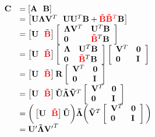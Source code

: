 \begin{equation}
\begin{array}{llll}
\mathbf{C} &= \left[{\mathbf{A}} \ \ \mathbf{B}\right]\\
&= \left[\mathbf{U}\mathbf{\Lambda}\mathbf{V}^T \ \ \mathbf{U}\mathbf{U}^T\mathbf{B} + {\color{red}\mathbf{\tilde{B}}} {\color{red}\mathbf{\tilde{B}}^T}{\mathbf{B}}\right]\\
&= \left[\mathbf{U} \ \ {\color{red}\mathbf{\tilde{B}}}\right]\left[\begin{array}{llll}\mathbf{\Lambda}\mathbf{V}^T &\mathbf{U}^T\mathbf{B}\\ \mathbf{0} & {\color{red}\mathbf{\tilde{B}}}^T\mathbf{B}\end{array}\right]\\
&= \left[\mathbf{U} \ \ {\color{red}\mathbf{\tilde{B}}}\right]\left[\begin{array}{llll}\mathbf{\Lambda} & \mathbf{U}^T\mathbf{B}\\ \mathbf{0} & {\color{red}\mathbf{\tilde{B}}}^T\mathbf{B}\end{array}\right] \left[\begin{array}{llll}\mathbf{V}^T & \mathbf{0}\\ \mathbf{0} & \mathbf{I}\end{array}\right]\\
&= \left[\mathbf{U} \ \ {\color{red}\mathbf{\tilde{B}}}\right]\mathbf{R} \left[\begin{array}{llll}\mathbf{V}^T & \mathbf{0}\\ \mathbf{0} & \mathbf{I}\end{array}\right]\\
 &= \left[\mathbf{U} \ \ {\color{red}\mathbf{\tilde{B}}}\right]\mathbf{\tilde{U}}\mathbf{\tilde{\Lambda}}\mathbf{\tilde{V}}^T \left[\begin{array}{llll}\mathbf{V}^T & \mathbf{0}\\ \mathbf{0} & \mathbf{I}\end{array}\right]\\
&= \bigg(\left[\mathbf{U} \ \ {\color{red}\mathbf{\tilde{B}}}\right]\mathbf{\tilde{U}}\bigg) \mathbf{\tilde{\Lambda}} \bigg(\mathbf{\tilde{V}}^T \left[\begin{array}{llll}\mathbf{V}^T & \mathbf{0}\\ \mathbf{0} & \mathbf{I}\end{array}\right]\bigg)\\
&=\mathbf{U'}\mathbf{\tilde{\Lambda}}\mathbf{V'}^T
\end{array}
\label{Eqn:short}
\end{equation}

